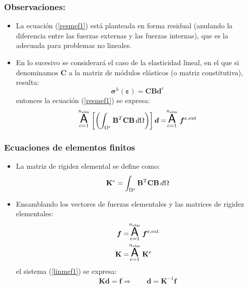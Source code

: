 \documentclass[10pt, aspectratio=43]{beamer}
\begin{document}
\begin{frame}
\frametitle{Observaciones:}
\begin{itemize}
\item La ecuación (\ref{resmef1}) está planteada en forma
residual (anulando la diferencia entre las fuerzas externas y las fuerzas
internas), que es la adecuada para problemas no lineales.
\item En lo sucesivo se considerará el caso de la elasticidad lineal, en el
que si denominamos $\mathbf{C}$ a la matriz de módulos elásticos 
(o matriz constitutiva), resulta:
\begin{equation}
\bm{\sigma}^h(\bm{\varepsilon})=
\mathbf{C} \mathbf{B}\bm{d}^e
\end{equation}
entonces la ecuación (\ref{resmef1}) se expresa:
\begin{equation}
\stackrel{n_{\textrm{elm}}}{\underset{e=1}{\mbox{\LARGE{\bf {\sf A}}}}} \left[
\left(\int_{\Omega^e} \mathbf{B}^T \mathbf{C} \mathbf{B} \, d \Omega \right)
\right]\bm{d}=
\stackrel{n_{\textrm{elm}}}{\underset{e=1}{\mbox{\LARGE{\bf {\sf A}}}}}
\bm{f}^{e,\textrm{ext}} \label{linmef1}
\end{equation}
\end{itemize}
\end{frame}
\begin{frame}
\frametitle{Ecuaciones de elementos finitos}
\begin{itemize}
\item La matriz de rigidez elemental se define como:
\begin{equation}
\mathbf{K}^{e}=
\int_{\Omega^{e}} \mathbf{B}^{\rm T}  \mathbf{C}
\mathbf{B} \, d \Omega \label{arrc}
\end{equation}
\item Ensamblando los vectores de fuerzas elementales y las matrices de
rigidez elementales:
\begin{align}
\bm{f}&=\stackrel{n_{\textrm{elm}}}{\underset{e=1}{\mbox{\LARGE{\bf {\sf A}}}}}
\bm{f}^{e,\textrm{ext}} \\
\mathbf{K}&=\stackrel{n_{\textrm{elm}}}{\underset{e=1}{\mbox{\LARGE{\bf {\sf A}}}}} \mathbf{K}^{e}
\end{align}
el sistema (\ref{linmef1}) se expresa:
\begin{equation}
\mathbf{K} \bm{d}=\bm{f} \Rightarrow \qquad \bm{d}=\mathbf{K}^{-1} \bm{f}
\end{equation}
\end{itemize}
\end{frame}
\end{document}
